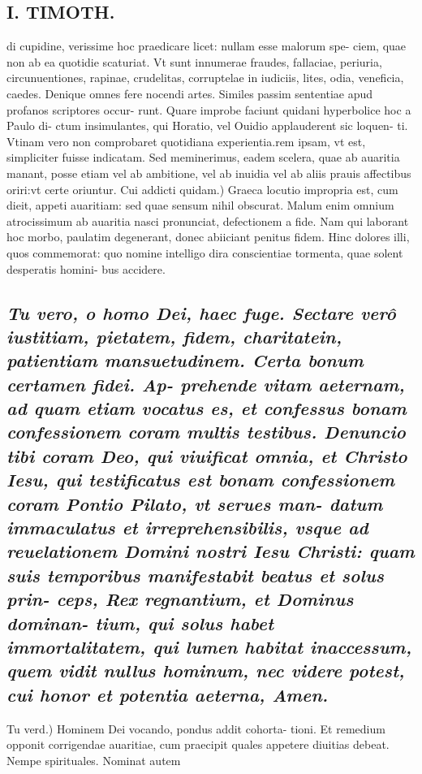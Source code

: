 \documentclass{article}
\begin{document}
\begin{pages}
\section*{I. TIMOTH. }
\marginpar{[ p.78 ]}\pstart di cupidine, verissime hoc praedicare licet: nullam esse malorum spe- ciem, quae non ab ea quotidie scaturiat. Vt sunt innumerae fraudes, fallaciae, periuria, circunuentiones, rapinae, crudelitas, corruptelae in iudiciis, lites, odia, veneficia, caedes. Denique omnes fere nocendi artes. Similes passim sententiae apud profanos scriptores occur- runt. Quare improbe faciunt quidani hyperbolice hoc a Paulo di- ctum insimulantes, qui Horatio, vel Ouidio applauderent sic loquen- ti. Vtinam vero non comprobaret quotidiana experientia.rem ipsam, vt est, simpliciter fuisse indicatam. Sed meminerimus, eadem scelera, quae ab auaritia manant, posse etiam vel ab ambitione, vel ab inuidia vel ab aliis prauis affectibus oriri:vt certe oriuntur.  \pend\pstart Cui addicti quidam.) Graeca locutio impropria est, cum dieit, appeti auaritiam: sed quae sensum nihil obscurat. Malum enim omnium atrocissimum ab auaritia nasci pronunciat, defectionem a fide. Nam qui laborant hoc morbo, paulatim degenerant, donec abiiciant penitus fidem. Hinc dolores illi, quos commemorat: quo nomine intelligo dira conscientiae tormenta, quae solent desperatis homini- bus accidere.  \pend
{}
{}
\subsection*{\textit{Tu vero, o homo Dei, haec fuge. Sectare verô iustitiam, pietatem, fidem, charitatein, patientiam mansuetudinem. Certa bonum certamen fidei. Ap- prehende vitam aeternam, ad quam etiam vocatus es, et confessus bonam confessionem coram multis testibus. Denuncio tibi coram Deo, qui viuificat omnia, et Christo Iesu, qui testificatus est bonam confessionem coram Pontio Pilato, vt serues man- datum immaculatus et irreprehensibilis, vsque ad reuelationem Domini nostri Iesu Christi: quam suis temporibus manifestabit beatus et solus prin- ceps, Rex regnantium, et Dominus dominan- tium, qui solus habet immortalitatem, qui lumen habitat inaccessum, quem vidit nullus hominum, nec videre potest, cui honor et potentia aeterna, Amen. }}\pstart Tu verd.) Hominem Dei vocando, pondus addit cohorta- tioni. Et remedium opponit corrigendae auaritiae, cum praecipit quales appetere diuitias debeat. Nempe spirituales. Nominat autem  \pend

\end{pages}
\end{document}
